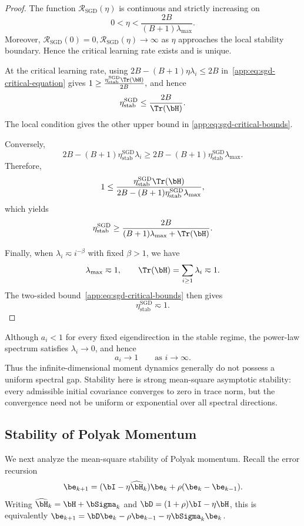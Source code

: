 \begin{proof}
The function $\mathcal R_{\mathrm{SGD}}(\eta)$ is continuous and
strictly increasing on
\[
0
<
\eta
<
\frac{2B}{(B+1)\lambda_{\max}}.
\]
Moreover,
\(
\mathcal R_{\mathrm{SGD}}(0)=0,
\mathcal R_{\mathrm{SGD}}(\eta)
\longrightarrow\infty
\)
as $\eta$ approaches the local stability boundary. Hence the critical
learning rate exists and is unique.

At the critical learning rate, using
\(
2B-(B+1)\eta\lambda_i
\leq
2B
\)
in~\eqref{app:eq:sgd-critical-equation} gives
\(
1
\geq
\frac{
\eta_{\mathrm{stab}}^{\mathrm{SGD}}
\Tr(\bH)
}{2B},
\)
and hence
\[
\eta_{\mathrm{stab}}^{\mathrm{SGD}}
\leq
\frac{2B}{\Tr(\bH)}.
\]
The local condition gives the other upper bound in
\eqref{app:eq:sgd-critical-bounds}.

Conversely,
\[
2B-(B+1)
\eta_{\mathrm{stab}}^{\mathrm{SGD}}\lambda_i
\geq
2B-(B+1)
\eta_{\mathrm{stab}}^{\mathrm{SGD}}\lambda_{\max}.
\]
Therefore,
\[
1
\leq
\frac{
\eta_{\mathrm{stab}}^{\mathrm{SGD}}\Tr(\bH)
}{
2B-(B+1)
\eta_{\mathrm{stab}}^{\mathrm{SGD}}\lambda_{\max}
},
\]
which yields
\[
\eta_{\mathrm{stab}}^{\mathrm{SGD}}
\geq
\frac{2B}
{(B+1)\lambda_{\max}+\Tr(\bH)}.
\]

Finally, when $\lambda_i\eqsim i^{-\beta}$ with fixed $\beta>1$,
we have
\[
\lambda_{\max}\eqsim1,
\qquad
\Tr(\bH)=\sum_{i\geq1}\lambda_i\eqsim1.
\]
The two-sided bound~\eqref{app:eq:sgd-critical-bounds} then gives
\[
\eta_{\mathrm{stab}}^{\mathrm{SGD}}
\eqsim1.
\]
\end{proof}

\begin{remark}
Although $a_i<1$ for every fixed eigendirection in the stable regime,
the power-law spectrum satisfies $\lambda_i\to0$, and hence
\[
a_i\to1
\qquad
\text{as }i\to\infty.
\]
Thus the infinite-dimensional moment dynamics generally do not possess
a uniform spectral gap. Stability here is strong mean-square
asymptotic stability: every admissible initial covariance converges to
zero in trace norm, but the convergence need not be uniform or
exponential over all spectral directions.
\end{remark}

\subsection{Stability of Polyak Momentum}
\label{app:subsec:hb_stability}
We next analyze the mean-square stability of Polyak momentum. Recall the error recursion
\begin{equation}
\label{app:eq:polyak-error-update}
\be_{k+1}
=
(\bI-\eta\widehat{\bH}_k)\be_k
+
\rho(\be_k-\be_{k-1}).
\end{equation}
Writing \(\widehat{\bH}_k=\bH+\bSigma_k\) and
\(\bD=(1+\rho)\bI-\eta\bH\), this is equivalently
\(\be_{k+1}=\bD\be_k-\rho\be_{k-1}-\eta\bSigma_k\be_k\).

